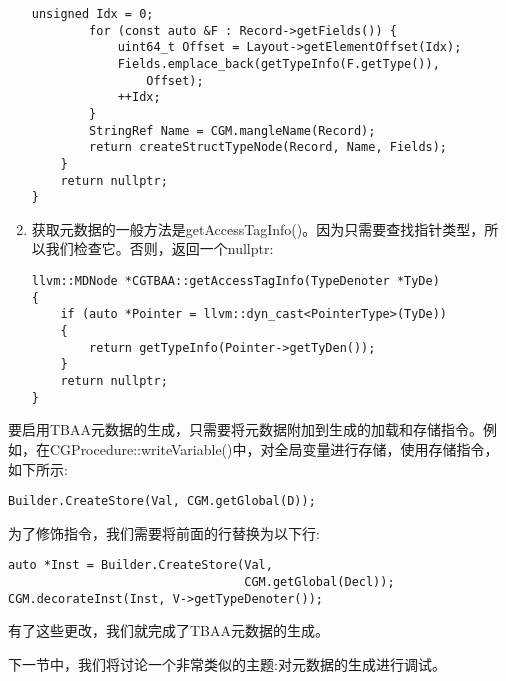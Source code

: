 \begin{enumerate}
\begin{lstlisting}[caption={}]
		unsigned Idx = 0;
		for (const auto &F : Record->getFields()) {
			uint64_t Offset = Layout->getElementOffset(Idx);
			Fields.emplace_back(getTypeInfo(F.getType()), 
				Offset);
			++Idx;
		}
		StringRef Name = CGM.mangleName(Record);
		return createStructTypeNode(Record, Name, Fields);
	}
	return nullptr;
}
\end{lstlisting}

\item 获取元数据的一般方法是getAccessTagInfo()。因为只需要查找指针类型，所以我们检查它。否则，返回一个nullptr:
\begin{lstlisting}[caption={}]
llvm::MDNode *CGTBAA::getAccessTagInfo(TypeDenoter *TyDe) 
{
	if (auto *Pointer = llvm::dyn_cast<PointerType>(TyDe)) 
	{
		return getTypeInfo(Pointer->getTyDen());
	}
	return nullptr;
}
\end{lstlisting}
\end{enumerate}

要启用TBAA元数据的生成，只需要将元数据附加到生成的加载和存储指令。例如，在CGProce\allowbreak dure::writeVariable()中，对全局变量进行存储，使用存储指令，如下所示:\par

\begin{lstlisting}[caption={}]
Builder.CreateStore(Val, CGM.getGlobal(D));
\end{lstlisting}

为了修饰指令，我们需要将前面的行替换为以下行:\par

\begin{lstlisting}[caption={}]
auto *Inst = Builder.CreateStore(Val,
								 CGM.getGlobal(Decl));
CGM.decorateInst(Inst, V->getTypeDenoter());
\end{lstlisting}

有了这些更改，我们就完成了TBAA元数据的生成。\par

下一节中，我们将讨论一个非常类似的主题:对元数据的生成进行调试。\par








